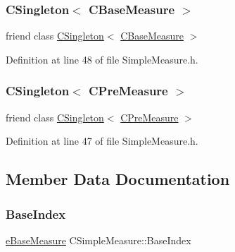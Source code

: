 \subsubsection{\texorpdfstring{C\+Singleton$<$ C\+Base\+Measure $>$}{CSingleton< CBaseMeasure >}}
{\footnotesize\ttfamily friend class \hyperlink{classCSingleton}{C\+Singleton}$<$ \hyperlink{classCBaseMeasure}{C\+Base\+Measure} $>$\hspace{0.3cm}{\ttfamily [friend]}}



Definition at line 48 of file Simple\+Measure.\+h.

\mbox{\label{classCSimpleMeasure_acbeb06f43abf4b8c9a86136c2b7bfe5f}} 
\subsubsection{\texorpdfstring{C\+Singleton$<$ C\+Pre\+Measure $>$}{CSingleton< CPreMeasure >}}
{\footnotesize\ttfamily friend class \hyperlink{classCSingleton}{C\+Singleton}$<$ \hyperlink{classCPreMeasure}{C\+Pre\+Measure} $>$\hspace{0.3cm}{\ttfamily [friend]}}



Definition at line 47 of file Simple\+Measure.\+h.



\subsection{Member Data Documentation}
\mbox{\label{classCSimpleMeasure_a191dbfa4cc374946bf8a82111f827d92}} 
\subsubsection{\texorpdfstring{Base\+Index}{BaseIndex}}
{\footnotesize\ttfamily \hyperlink{BaseMeasure_8h_ac90e5164ccf1f0d648fba7e94b229a11}{e\+Base\+Measure} C\+Simple\+Measure\+::\+Base\+Index\hspace{0.3cm}{\ttfamily [protected]}}



